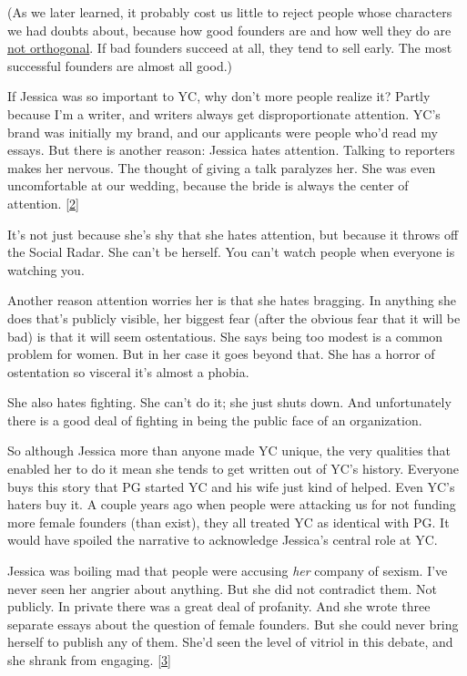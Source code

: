 (As we later learned, it probably cost us little to reject people whose
characters we had doubts about, because how good founders are and how
well they do are \href{mean.html}{not orthogonal}. If bad founders
succeed at all, they tend to sell early. The most successful founders
are almost all good.)

If Jessica was so important to YC, why don't more people realize it?
Partly because I'm a writer, and writers always get disproportionate
attention. YC's brand was initially my brand, and our applicants were
people who'd read my essays. But there is another reason: Jessica hates
attention. Talking to reporters makes her nervous. The thought of giving
a talk paralyzes her. She was even uncomfortable at our wedding, because
the bride is always the center of attention. {[}\hyperref[f2n]{2}{]}

It's not just because she's shy that she hates attention, but because it
throws off the Social Radar. She can't be herself. You can't watch
people when everyone is watching you.

Another reason attention worries her is that she hates bragging. In
anything she does that's publicly visible, her biggest fear (after the
obvious fear that it will be bad) is that it will seem ostentatious. She
says being too modest is a common problem for women. But in her case it
goes beyond that. She has a horror of ostentation so visceral it's
almost a phobia.

She also hates fighting. She can't do it; she just shuts down. And
unfortunately there is a good deal of fighting in being the public face
of an organization.

So although Jessica more than anyone made YC unique, the very qualities
that enabled her to do it mean she tends to get written out of YC's
history. Everyone buys this story that PG started YC and his wife just
kind of helped. Even YC's haters buy it. A couple years ago when people
were attacking us for not funding more female founders (than exist),
they all treated YC as identical with PG. It would have spoiled the
narrative to acknowledge Jessica's central role at YC.

Jessica was boiling mad that people were accusing \emph{her} company of
sexism. I've never seen her angrier about anything. But she did not
contradict them. Not publicly. In private there was a great deal of
profanity. And she wrote three separate essays about the question of
female founders. But she could never bring herself to publish any of
them. She'd seen the level of vitriol in this debate, and she shrank
from engaging. {[}\hyperref[f3n]{3}{]}

